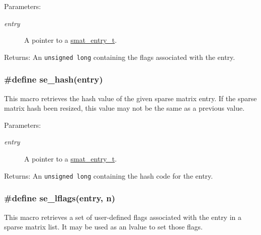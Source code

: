\begin{Desc}
\item[Parameters:]
\begin{description}
\item[{\em entry}]A pointer to a \hyperlink{group__dbprim__smat_a2}{smat\_\-entry\_\-t}.\end{description}
\end{Desc}
\begin{Desc}
\item[Returns:]An {\tt unsigned long} containing the flags associated with the entry. \end{Desc}
\hypertarget{group__dbprim__smat_a42}{
\subsubsection[se\_\-hash]{\setlength{\rightskip}{0pt plus 5cm}\#define se\_\-hash(entry)}}
\label{group__dbprim__smat_a42}


This macro retrieves the hash value of the given sparse matrix entry. If the sparse matrix hash been resized, this value may not be the same as a previous value.

\begin{Desc}
\item[Parameters:]
\begin{description}
\item[{\em entry}]A pointer to a \hyperlink{group__dbprim__smat_a2}{smat\_\-entry\_\-t}.\end{description}
\end{Desc}
\begin{Desc}
\item[Returns:]An {\tt unsigned long} containing the hash code for the entry. \end{Desc}
\hypertarget{group__dbprim__smat_a45}{
\subsubsection[se\_\-lflags]{\setlength{\rightskip}{0pt plus 5cm}\#define se\_\-lflags(entry, n)}}
\label{group__dbprim__smat_a45}


This macro retrieves a set of user-defined flags associated with the entry in a sparse matrix list. It may be used as an lvalue to set those flags.

